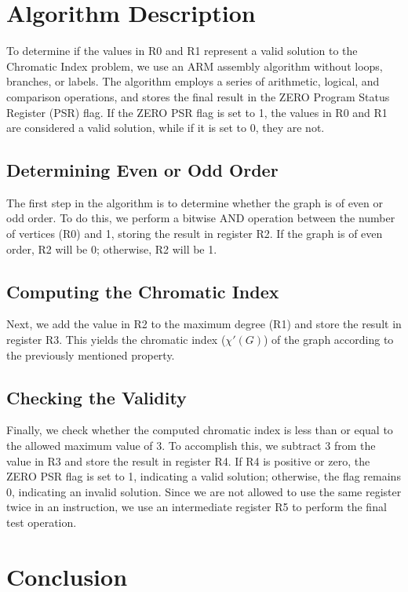 \section{Algorithm Description}

To determine if the values in R0 and R1 represent a valid solution to the Chromatic Index problem, we use an ARM assembly algorithm without loops, branches, or labels. The algorithm employs a series of arithmetic, logical, and comparison operations, and stores the final result in the ZERO Program Status Register (PSR) flag. If the ZERO PSR flag is set to 1, the values in R0 and R1 are considered a valid solution, while if it is set to 0, they are not.

\subsection{Determining Even or Odd Order}

The first step in the algorithm is to determine whether the graph is of even or odd order. To do this, we perform a bitwise AND operation between the number of vertices (R0) and 1, storing the result in register R2. If the graph is of even order, R2 will be 0; otherwise, R2 will be 1.

\subsection{Computing the Chromatic Index}

Next, we add the value in R2 to the maximum degree (R1) and store the result in register R3. This yields the chromatic index ($\chi'(G)$) of the graph according to the previously mentioned property.

\subsection{Checking the Validity}

Finally, we check whether the computed chromatic index is less than or equal to the allowed maximum value of 3. To accomplish this, we subtract 3 from the value in R3 and store the result in register R4. If R4 is positive or zero, the ZERO PSR flag is set to 1, indicating a valid solution; otherwise, the flag remains 0, indicating an invalid solution. Since we are not allowed to use the same register twice in an instruction, we use an intermediate register R5 to perform the final test operation.

\section{Conclusion}

